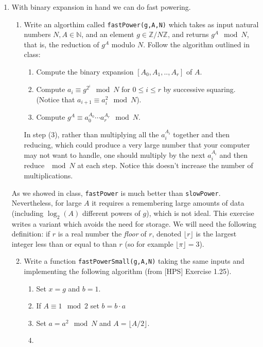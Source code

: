\documentclass[11pt]{article}
\newcommand{\bN}{\mathbb{N}}
\newcommand{\bZ}{\mathbb{Z}}
\begin{document}
\begin{enumerate}
{  }
  \item{
  With binary expansion in hand we can do fast powering.
  \begin{enumerate}
    \item{
    Write an algorthim called \verb|fastPower(g,A,N)| which takes as input natural numbers $N,A\in\bN$, and an element $g\in\bZ/N\bZ$, and returns $g^A\mod N$, that is, the reduction of $g^A$ modulo $N$.  Follow the algorithm outlined in class:
    \begin{enumerate}[(1)]
      \item{
      Compute the binary expansion $[A_0,A_1,..,A_r]$ of $A$.
      }
      \item{
      Compute $a_i \equiv g^{2^i}\mod N$ for $0\le i\le r$ by successive squaring.  (Notice that $a_{i+1}\equiv a_i^2\mod N$).
      }
      \item{
      Compute $g^A \equiv a_0^{A_0}\cdots a_r^{A_r}\mod N$.
      }
    \end{enumerate}
    In step (3), rather than multiplying all the $a_i^{A_i}$ together and then reducing, which could produce a very large number that your computer may not want to handle, one should multiply by the next $a_i^{A_i}$ and then reduce $\mod N$ at each step.  Notice this doesn't increase the number of multiplications.
    }
  \end{enumerate}
  As we showed in class, \verb|fastPower| is much better than \verb|slowPower|.  Nevertheless, for large $A$ it requires a remembering large amounts of data (including $\log_2(A)$ different powers of $g$), which is not ideal.  This exercise writes a variant which avoids the need for storage.  We will need the following definition: if $r$ is a real number the \textit{floor} of $r$, denoted $\lfloor r\rfloor$ is the largest integer less than or equal to than $r$ (so for example $\lfloor \pi\rfloor = 3$).
  \begin{enumerate}
    \setcounter{enumii}{1}
    \item{
    Write a function \verb|fastPowerSmall(g,A,N)| taking the same inputs and implementing the following algorithm (from [HPS] Exercise 1.25).
    \begin{enumerate}[(1)]
      \item{
      Set $x = g$ and $b = 1$.
      }
      \item{
      If $A\equiv1\mod 2$ set $b = b\cdot a$
      }
      \item{
      Set $a = a^2\mod N$ and $A = \lfloor{A}/{2}\rfloor$.
      }
      \item{
}
\end{enumerate}}
\end{enumerate}}
\end{enumerate}
\end{document}
